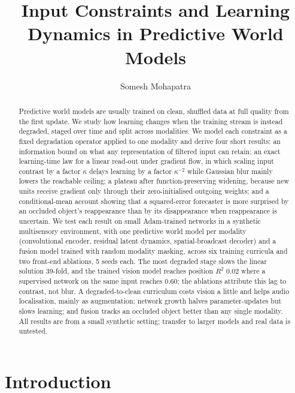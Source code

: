 \documentclass{article}
\title{Input Constraints and Learning Dynamics in Predictive World Models}
\author[1*]{Somesh Mohapatra}
\affil[1]{Independent.}
\affil[*]{Address correspondence to: pikulsomesh@gmail.com}
\date{}
\theoremstyle{plain}
\theoremstyle{remark}
\begin{document}
\maketitle

\begin{abstract}
Predictive world models are usually trained on clean, shuffled data at full quality from the first update. We study how learning changes when the training stream is instead degraded, staged over time and split across modalities. We model each constraint as a fixed degradation operator applied to one modality and derive four short results: an information bound on what any representation of filtered input can retain; an exact learning-time law for a linear read-out under gradient flow, in which scaling input contrast by a factor \(\kappa\) delays learning by a factor \(\kappa^{-2}\) while Gaussian blur mainly lowers the reachable ceiling; a plateau after function-preserving widening, because new units receive gradient only through their zero-initialised outgoing weights; and a conditional-mean account showing that a squared-error forecaster is more surprised by an occluded object's reappearance than by its disappearance when reappearance is uncertain. We test each result on small Adam-trained networks in a synthetic multisensory environment, with one predictive world model per modality (convolutional encoder, residual latent dynamics, spatial-broadcast decoder) and a fusion model trained with random modality masking, across six training curricula and two front-end ablations, 5 seeds each. The most degraded stage slows the linear solution 39-fold, and the trained vision model reaches position \(R^2\) 0.02 where a supervised network on the same input reaches 0.60; the ablations attribute this lag to contrast, not blur. A degraded-to-clean curriculum costs vision a little and helps audio localisation, mainly as augmentation; network growth halves parameter-updates but slows learning; and fusion tracks an occluded object better than any single modality. All results are from a small synthetic setting; transfer to larger models and real data is untested.
\end{abstract}

\section{Introduction}
\label{sec:intro}
\end{document}
